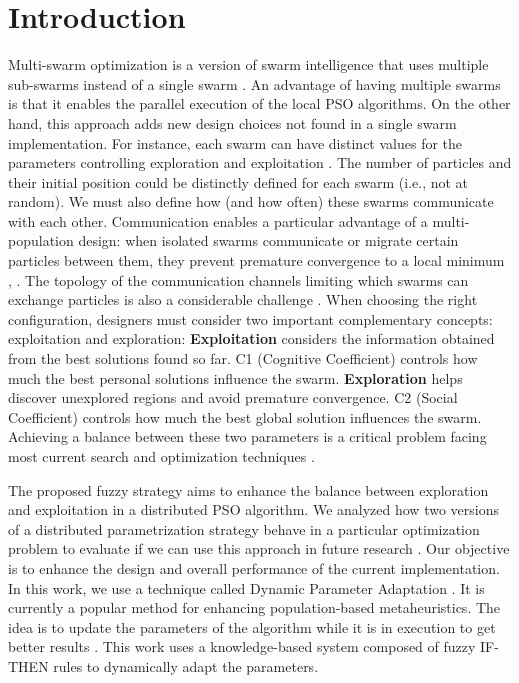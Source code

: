 \documentclass[runningheads]{llncs}
\begin{document}
\section{Introduction}

Multi-swarm optimization is a version of swarm intelligence that uses multiple sub-swarms instead of a single swarm \cite{jain2022overview}. An advantage of having multiple swarms is that it enables the parallel execution of the local PSO algorithms.
On the other hand, this approach adds new design choices not found in a single swarm implementation. For instance, each swarm can have distinct values for the parameters controlling exploration and exploitation \cite{shi2001fuzzy}. The number of particles and their initial position could be distinctly defined for each swarm (i.e., not at random).
We must also define how (and how often) these swarms communicate with each other. Communication enables a particular advantage of a multi-population design: when isolated swarms communicate or migrate certain particles between them, they prevent premature convergence to a local minimum \cite{xia2018multi}, \cite{kennedy2006swarm}. The topology of the communication channels limiting which swarms can exchange particles is also a considerable challenge \cite{miramontes2022interval}. When choosing the right configuration, designers must consider two important complementary concepts: exploitation and exploration:
\textbf{Exploitation} considers the information obtained from the best solutions found so far.  
C1 (Cognitive Coefficient) controls how much the best personal  solutions influence the swarm. 
\textbf{Exploration} helps discover unexplored regions and avoid premature convergence. 
C2 (Social Coefficient) controls how much the best global solution influences the swarm.
Achieving a balance between these two parameters is a critical problem facing most current search and optimization techniques \cite{vargas2011estrategias}. 

The proposed fuzzy strategy aims to enhance the balance between exploration and exploitation in a distributed PSO algorithm. We analyzed how two versions of a distributed parametrization strategy behave in a particular optimization problem \cite{garcia2023distributed} to evaluate if we can use this approach in future research \cite{clerc2010particle}. Our objective is to enhance the design and overall performance of the current implementation. In this work, we use a technique called Dynamic Parameter Adaptation \cite{olivas2016dynamic}. It is currently a popular method for enhancing population-based metaheuristics. The idea is to update the parameters of the algorithm while it is in execution to get better results \cite{mancilla2023optimization}. This work uses a knowledge-based system composed of fuzzy IF-THEN rules to dynamically adapt the parameters.
\end{document}
